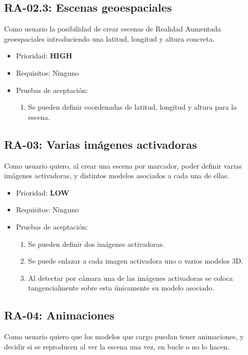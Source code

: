 \subsection{RA-02.3: Escenas geoespaciales}
Como usuario la posibilidad de crear escenas de Realidad Aumentada geoespaciales introduciendo una latitud, longitud y altura concreta.

\begin{itemize}
    \item Prioridad: \textbf{HIGH}
    \item Requisitos: Ninguno
    \item Pruebas de aceptación:
	\begin{enumerate}
		\item Se pueden definir coordenadas de latitud, longitud y altura para la escena.
	\end{enumerate}
\end{itemize}

\subsection{RA-03: Varias imágenes activadoras}
Como usuario quiero, al crear una escena por marcador, poder definir varias imágenes activadoras, y distintos modelos asociados a cada una de ellas.

\begin{itemize}
    \item Prioridad: \textbf{LOW}
    \item Requisitos: Ninguno
    \item Pruebas de aceptación:
	\begin{enumerate}
		\item Se pueden definir dos imágenes activadoras.
		\item Se puede enlazar a cada imagen activadora uno o varios modelos 3D.
		\item Al detectar por cámara una de las imágenes activadoras se coloca tangencialmente sobre esta únicamente su modelo asociado.
	\end{enumerate}
\end{itemize}

\subsection{RA-04: Animaciones}
Como usuario quiero que los modelos que cargo puedan tener animaciones, y decidir si se reproducen al ver la escena una vez, en bucle o no lo hacen.

